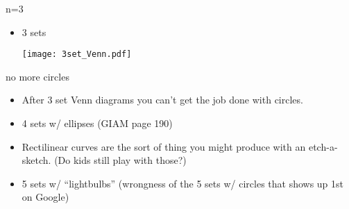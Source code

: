 \documentclass[handout,landscape]{beamer}
\begin{document}
\begin{frame}{n=3}
\begin{itemize}
\item 3 sets

\vspace{.2in}

\texttt{[image: 3set\_Venn.pdf]}

\vspace{.2in}

\end{itemize}
\end{frame}

\begin{frame}{no more circles}
\begin{itemize}
\item After 3 set Venn diagrams you can't get the job done with circles. \pause
\item 4 sets w/ ellipses (GIAM page 190)\pause
\item Rectilinear curves are the sort of thing you might produce with an etch-a-sketch. \pause \newline
(Do kids still play with those?) \pause
\item 5 sets w/ ``lightbulbs'' (wrongness of the 5 sets w/ circles that shows up 1st on Google)
\end{itemize}
\end{frame}
\end{document}
